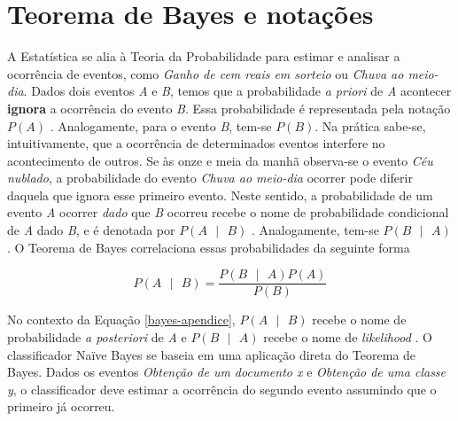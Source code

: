 \appendix

\chapter{Teorema de Bayes e notações}

A Estatística se alia à Teoria da Probabilidade para estimar e analisar a ocorrência de eventos, como \emph{Ganho de cem reais em sorteio} ou \emph{Chuva ao meio-dia}. Dados dois eventos \emph{A} e \emph{B}, temos que a probabilidade \emph{a priori} de \emph{A} acontecer \textbf{ignora} a ocorrência do evento \emph{B}. Essa probabilidade é representada pela notação \ensuremath{P(A)} \cite{spiegelhalter}. Analogamente, para o evento \emph{B}, tem-se \ensuremath{P(B)}. Na prática sabe-se, intuitivamente, que a ocorrência de determinados eventos interfere no acontecimento de outros. Se às onze e meia da manhã observa-se o evento \emph{Céu nublado}, a probabilidade do evento \emph{Chuva ao meio-dia} ocorrer pode diferir daquela que ignora esse primeiro evento. Neste sentido, a probabilidade de um evento \emph{A} ocorrer \emph{dado} que \emph{B} ocorreu recebe o nome de probabilidade condicional de \emph{A} dado \emph{B}, e é denotada por \ensuremath{P(A\mbox{ }|\mbox{ }B)} \cite{spiegelhalter}. Analogamente, tem-se \ensuremath{P(B\mbox{ }|\mbox{ }A)}. O Teorema de Bayes correlaciona essas probabilidades da seguinte forma \cite{spiegelhalter}

\begin{equation}
\label{bayes-apendice}
\ensuremath{P(A\mbox{ }|\mbox{ }B) = \frac{P(B\mbox{ }|\mbox{ }A)P(A)}{P(B)}} 
\end{equation}

No contexto da Equação \ref{bayes-apendice}, \ensuremath{P(A\mbox{ }|\mbox{ }B)} recebe o nome de probabilidade \emph{a posteriori} de \emph{A} e \ensuremath{P(B\mbox{ }|\mbox{ }A)} recebe o nome de \emph{likelihood} \cite{spiegelhalter}. O classificador Naïve Bayes se baseia em uma aplicação direta do Teorema de Bayes.  Dados os eventos \emph{Obtenção de um documento x} e \emph{Obtenção de uma classe y}, o classificador deve estimar a ocorrência do segundo evento assumindo que o primeiro já ocorreu.   

